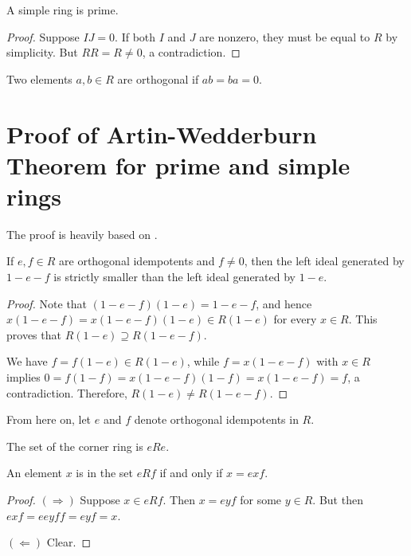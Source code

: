   \begin{theorem}
    \label{thm:simple_ring_is_prime}
    A simple ring is prime.
  \end{theorem}
  \begin{proof}
    Suppose $IJ = 0$. If both $I$ and $J$ are nonzero, they must be equal to $R$ by simplicity. But $RR = R \neq 0$, a contradiction.
  \end{proof}

  \begin{definition}
    \label{def:is_semisimple}
    Two elements $a, b \in R$ are orthogonal if $ab = ba = 0$.
  \end{definition}

\section{Proof of Artin-Wedderburn Theorem for prime and simple rings}
The proof is heavily based on \cite{bresar2024wedderburnartintheorem}.
  \begin{theorem}
    \label{thm:one_sub_e_larger_span_on_sub_e_sub_f}
    If $e, f \in R$ are orthogonal idempotents and $f \neq 0$, then the left ideal generated by $1 - e - f$ is strictly smaller than the left ideal generated by $1 - e$.
  \end{theorem}
  \begin{proof}
    Note that $(1 - e - f)(1 - e) = 1 - e - f$, and hence
    $x(1 - e - f) = x(1 - e - f)(1 - e) \in R(1 - e)$
    for every $x \in R$. This proves that $R(1 - e) \supseteq R(1 - e - f)$.
    
    We have $f = f(1 - e) \in R(1 - e)$, while $f = x(1 - e - f)$ with $x \in R$ implies
    $0 = f(1 - f) = x(1 - e - f)(1 - f) = x(1 - e - f) = f$,
    a contradiction. Therefore, $R(1 - e) \neq R(1 - e - f)$.
  \end{proof}

  From here on, let $e$ and $f$ denote orthogonal idempotents in $R$.

  \begin{definition}
    \label{def:corner_ring}
    The set of the corner ring is $eRe$.
  \end{definition}

  \begin{theorem}
    \label{thm:characterization_of_corner_elements}
    An element $x$ is in the set $e R f$ if and only if $x = e x f$.
  \end{theorem}
  \begin{proof}
    $(\Rightarrow)$ Suppose $x \in e R f$. Then $x = e y f$ for some $y \in R$. But then $e x f = e e y f f = e y f = x$.

    $(\Leftarrow)$ Clear.
  \end{proof}
    

